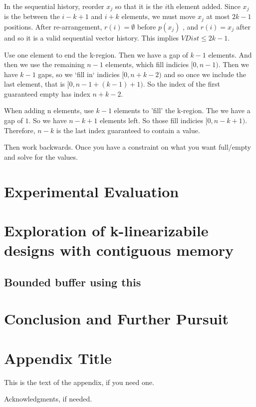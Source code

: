 \documentclass{sigplanconf}
\begin{document}
In the sequential history, reorder $x_j$ so that it is the $i$th element added. Since $x_j$ is the between the $i-k+1$ and $i+k$ elements, we must move $x_j$ at most $2k-1$ positions. After re-arrangement, $r(i) = \emptyset$ before $p(x_j)$ , and $r(i) = x_j$ after and so it is a valid sequential vector history. This implies $VDist \le 2k-1$.

Use one element to end the k-region. Then we have a gap of $k-1$ elements. And then we use the remaining $n-1$ elements, which fill indicies $[0, n-1)$. Then we have $k-1$ gaps, so we `fill in` indicies $[0, n+k-2)$ and so once we include the last element, that is $[0, n-1+(k-1)+1)$. So the index of the first guaranteed empty has index $n+k-2$.

When adding n elements,
use $k-1$ elements to 'fill' the k-region.
The we have a gap of $1$.
So we have $n-k+1$ elements left.
So those fill indicies $[0, n-k+1)$.
Therefore, $n-k$ is the last index guaranteed to contain a value.

Then work backwards. Once you have a constraint on what you want full/empty and solve for the values.

\section{Experimental Evaluation}

\section{Exploration of k-linearizabile designs with contiguous memory}
\subsection{Bounded buffer using this}

\section{Conclusion and Further Pursuit}

\appendix
\section{Appendix Title}

This is the text of the appendix, if you need one.

\acks

Acknowledgments, if needed.





%
%
%
\end{document}

